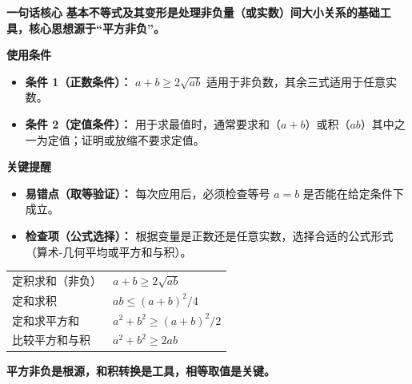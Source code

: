\begin{summarybox}
\textbf{\textcolor{CSummary}{一句话核心}}
\textbf{基本不等式及其变形是处理非负量（或实数）间大小关系的基础工具，核心思想源于“平方非负”。}

\medskip
\textbf{\textcolor{CSummary}{使用条件}}
\begin{itemize}[leftmargin=*, itemsep=0.5em, topsep=0.4em]
    \item \textbf{条件 1（正数条件）：} $a+b\ge2\sqrt{ab}$ 适用于非负数，其余三式适用于任意实数。
    \item \textbf{条件 2（定值条件）：} 用于求最值时，通常要求和（$a+b$）或积（$ab$）其中之一为定值；证明或放缩不要求定值。
\end{itemize}

\medskip
\textbf{\textcolor{CSummary}{关键提醒}}
\begin{itemize}[leftmargin=*, itemsep=0.5em, topsep=0.4em]
    \item \textbf{易错点（取等验证）：} 每次应用后，必须检查等号 $a=b$ 是否能在给定条件下成立。
    \item \textbf{检查项（公式选择）：} 根据变量是正数还是任意实数，选择合适的公式形式（算术-几何平均或平方和与积）。
\end{itemize}

\begin{center}
\begin{tabular}{ll}
定积求和（非负）&$a+b\ge2\sqrt{ab}$\\
定和求积&$ab\le(a+b)^2/4$\\
定和求平方和&$a^2+b^2\ge(a+b)^2/2$\\
比较平方和与积&$a^2+b^2\ge2ab$
\end{tabular}
\end{center}
\textbf{平方非负是根源，和积转换是工具，相等取值是关键。}

\end{summarybox}
